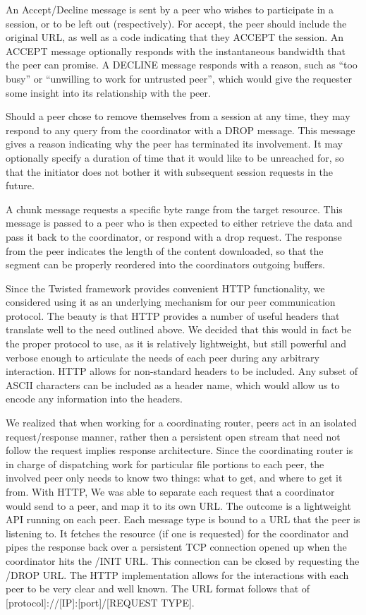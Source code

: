 \documentclass[12pt]{article}
\begin{document}
			An Accept/Decline message is sent by a peer who wishes to participate in a session, or to be left out (respectively). For accept, the peer should include the original URL, as well as a code indicating that they ACCEPT the session. An ACCEPT message optionally responds with the instantaneous bandwidth that the peer can promise. A DECLINE message responds with a reason, such as ``too busy'' or ``unwilling to work for untrusted peer'', which would give the requester some insight into its relationship with the peer.

			Should a peer chose to remove themselves from a session at any time, they may respond to any query from the coordinator with a DROP message. This message gives a reason indicating why the peer has terminated its involvement. It may optionally specify a duration of time that it would like to be unreached for, so that the initiator does not bother it with subsequent session requests in the future.
			
			A chunk message requests a specific byte range from the target resource. This message is passed to a peer who is then expected to either retrieve the data and pass it back to the coordinator, or respond with a drop request. The response from the peer indicates the length of the content downloaded, so that the segment can be properly reordered into the coordinators outgoing buffers.

			Since the Twisted framework provides convenient HTTP functionality, we considered using it as an underlying mechanism for our peer communication protocol. The beauty is that HTTP provides a number of useful headers that translate well to the need outlined above. We decided that this would in fact be the proper protocol to use, as it is relatively lightweight, but still powerful and verbose enough to articulate the needs of each peer during any arbitrary interaction. HTTP allows for non-standard headers to be included. Any subset of ASCII characters can be included as a header name, which would allow us to encode any information into the headers.

			We realized that when working for a coordinating router, peers act in an isolated request/response manner, rather then a persistent open stream that need not follow the request implies response architecture. Since the coordinating router is in charge of dispatching work for particular file portions to each peer, the involved peer only needs to know two things: what to get, and where to get it from. With HTTP, We was able to separate each request that a coordinator would send to a peer, and map it to its own URL. The outcome is a lightweight API running on each peer. Each message type is bound to a URL that the peer is listening to. It fetches the resource (if one is requested) for the coordinator and pipes the response back over a persistent TCP connection opened up when the coordinator hits the /INIT URL. This connection can be closed by requesting the /DROP URL. The HTTP implementation allows for the interactions with each peer to be very clear and well known. The URL format follows that of [protocol]://[IP]:[port]/[REQUEST TYPE].
\end{document}
